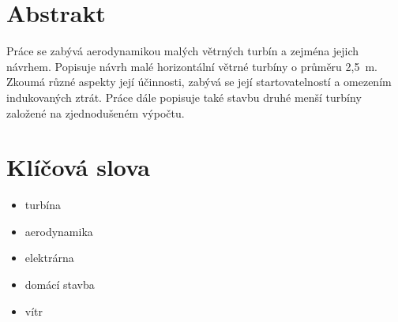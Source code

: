 
\renewcommand{\labelitemi}{--}

\section*{Abstrakt}\label{AbstraktCZ}

\begin{spacing}{1.3}
	Práce se zabývá aerodynamikou malých větrných turbín a zejména jejich návrhem. Popisuje návrh malé horizontální větrné turbíny o průměru 2,5~m. Zkoumá různé aspekty její účinnosti, zabývá se její startovatelností a omezením indukovaných ztrát.
	Práce dále popisuje také stavbu druhé menší turbíny založené na zjednodušeném výpočtu.
\end{spacing}

\section*{Klíčová slova}

\begin{itemize}
	\item turbína
	\item aerodynamika
	\item elektrárna
	\item domácí stavba
	\item vítr
\end{itemize}

\newpage

